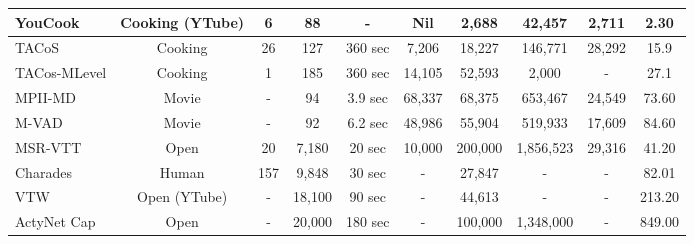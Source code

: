 \begin{table*}[h!]
\begin{tabular}{|l|c|c|c|c|c|c|c|c|c|}
    YouCook \cite{das2013thousand} & Cooking (YTube) & 6 & 88 & - & Nil & 2,688 & 42,457 & 2,711 & 2.30 \\
    \hline
    TACoS \cite{regneri2013grounding} & Cooking & 26 & 127 & 360 sec & 7,206 & 18,227 & 146,771 & 28,292 & 15.9 \\
    \hline
    TACos-MLevel \cite{rohrbach2014coherent}& Cooking & 1 & 185 & 360 sec & 14,105 & 52,593 & 2,000 & - & 27.1 \\
    \hline
    MPII-MD \cite{rohrbach2015dataset} & Movie & - & 94 & 3.9 sec & 68,337 & 68,375 & 653,467 & 24,549 & 73.60 \\
    \hline
    M-VAD \cite{torabi2015using} & Movie & - & 92 & 6.2 sec & 48,986 & 55,904 & 519,933 & 17,609 & 84.60 \\
    \hline
    MSR-VTT \cite{xu2016msr} & {Open} & 20 & 7,180 & 20 sec & 10,000 & 200,000 & 1,856,523 & 29,316 & 41.20 \\
    \hline
    Charades \cite{sigurdsson2016hollywood} & Human & 157 & 9,848 & 30 sec & - & 27,847 & - & - & 82.01 \\
    \hline
    VTW \cite{zeng2016generation} & {Open} (YTube) & - & 18,100 & 90 sec & - & 44,613 & - & - & 213.20 \\
    \hline
    ActyNet Cap \cite{krishna2017dense} & Open & - & 20,000 & 180 sec & - & 100,000 & 1,348,000 & - & 849.00 \\
    \hline
\end{tabular}
\label{tab:datasets}
\end{table*}